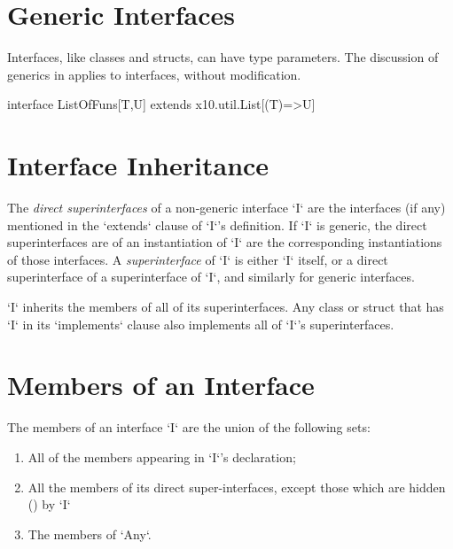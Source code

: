 \section{Generic Interfaces}

Interfaces, like classes and structs, can have type parameters.  
The discussion of generics in  applies to interfaces,
without modification.

\begin{ex}
\begin{xten}
interface ListOfFuns[T,U] extends x10.util.List[(T)=>U] {}
\end{xten}
%

\end{ex}

\section{Interface Inheritance}

The {\em direct superinterfaces} of a non-generic interface \xcd`I` are the interfaces
(if any) mentioned in the \xcd`extends` clause of \xcd`I`'s definition.
If \xcd`I`  is generic, the direct superinterfaces are of an instantiation of
\xcd`I` are the corresponding instantiations of those interfaces.
A {\em superinterface} of \xcd`I` is either \xcd`I` itself, or a direct
superinterface of a superinterface of \xcd`I`, and similarly for generic
interfaces.    

\xcd`I` inherits the members of all of its superinterfaces. Any class or
struct that has \xcd`I` in its \xcd`implements` clause also implements all of
\xcd`I`'s superinterfaces. 






\section{Members of an Interface}

The members of an interface \xcd`I` are the union of the following sets: 
\begin{enumerate}
\item All of the members appearing in \xcd`I`'s declaration;
\item All the members of its direct super-interfaces, except those which are
      hidden () by \xcd`I`
\item The members of \xcd`Any`.
\end{enumerate}


